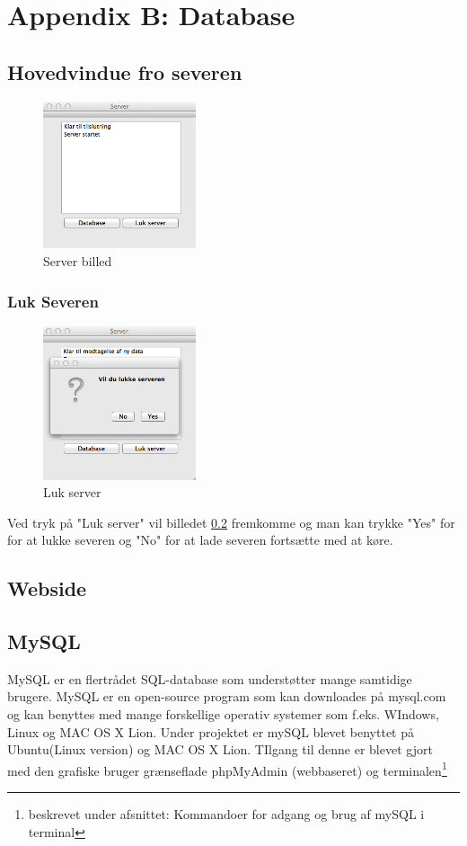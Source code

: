 \chapter*{Appendix B: Database}
\section{Hovedvindue fro severen}
\begin{figure}[htbp]
	\centering
	\includegraphics[width=0.4\textwidth]{billeder/database/server}
	\caption{Server billed}
	\label{fig:server}
\end{figure}


\subsection{Luk Severen}
\begin{figure}[htbp]
	\centering
	\includegraphics[width=0.4\textwidth]{billeder/database/databaseLogOff}
	\caption{Luk server}
	\label{fig:databselLogOff}
\end{figure}
Ved tryk på "Luk server" vil billedet \ref{fig:databselLogOff} fremkomme og man kan trykke "Yes" for for at lukke severen og "No" for at lade severen fortsætte med at køre.

\section{Webside}

\section{MySQL}
MySQL er en flertrådet SQL-database som understøtter mange samtidige brugere. MySQL er en open-source program som kan downloades på mysql.com og kan benyttes med mange forskellige operativ systemer som f.eks. WIndows, Linux og MAC OS X Lion.
Under projektet er mySQL blevet benyttet på Ubuntu(Linux version) og MAC OS X Lion. TIlgang til denne er blevet gjort med den grafiske bruger grænseflade phpMyAdmin (webbaseret) og terminalen\footnote{beskrevet under afsnittet: Kommandoer for adgang og brug af mySQL i terminal}

